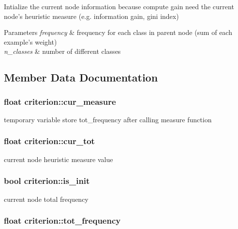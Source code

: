 Intialize the current node information because compute {\ttfamily gain} need the current node's heuristic measure (e.\+g. information gain, gini index) 


\begin{DoxyParams}{Parameters}
{\em frequency} & frequency for each class in parent node (sum of each example's weight) \\
\hline
{\em n\+\_\+classes} & number of different classes \\
\hline
\end{DoxyParams}


\subsection{Member Data Documentation}
\hypertarget{classcriterion_af8e6efc16000b83cffb9e0864bf68561}{
\subsubsection[{cur\+\_\+measure}]{\setlength{\rightskip}{0pt plus 5cm}float criterion\+::cur\+\_\+measure\hspace{0.3cm}{\ttfamily [protected]}}}\label{classcriterion_af8e6efc16000b83cffb9e0864bf68561}
temporary variable store {\ttfamily tot\+\_\+frequency} after calling {\ttfamily measure} function \hypertarget{classcriterion_aa89bec3e37cd874b3590887038712c54}{
\subsubsection[{cur\+\_\+tot}]{\setlength{\rightskip}{0pt plus 5cm}float criterion\+::cur\+\_\+tot\hspace{0.3cm}{\ttfamily [protected]}}}\label{classcriterion_aa89bec3e37cd874b3590887038712c54}
current node heuristic measure value \hypertarget{classcriterion_a5f3c4708d9e6a9120ec8b8d98c73ff47}{
\subsubsection[{is\+\_\+init}]{\setlength{\rightskip}{0pt plus 5cm}bool criterion\+::is\+\_\+init\hspace{0.3cm}{\ttfamily [protected]}}}\label{classcriterion_a5f3c4708d9e6a9120ec8b8d98c73ff47}
current node total frequency \hypertarget{classcriterion_ac226599a3e6e160614d3698193053368}{
\subsubsection[{tot\+\_\+frequency}]{\setlength{\rightskip}{0pt plus 5cm}float criterion\+::tot\+\_\+frequency\hspace{0.3cm}{\ttfamily [protected]}}}\label{classcriterion_ac226599a3e6e160614d3698193053368}


